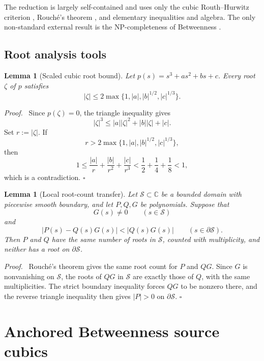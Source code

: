 \documentclass[final,5p,times,twocolumn]{elsarticle}
\newcommand{\C}{\mathbb C}
\newcommand{\abs}[1]{\left|#1\right|}
\newtheorem{lemma}[theorem]{Lemma}
\newenvironment{proof}[1][Proof]
  {\par\smallskip\noindent\textit{#1.}\ }
  {\hfill$\square$\par\smallskip}
\begin{document}
The reduction is largely self-contained and uses only the cubic Routh--Hurwitz criterion \cite{Gantmacher1959}, Rouch\'e's theorem \cite{Conway1978}, and elementary inequalities and algebra. The only non-standard external result is the NP-completeness of Betweenness \cite{Opatrny1979}.

\subsection{Root analysis tools}

\begin{lemma}[Scaled cubic root bound]\label{lem:scaled-cubic-bound}
Let $p(s)=s^3+as^2+bs+c$. Every root $\zeta$ of $p$ satisfies
\[
\abs\zeta\le2\max\{1,\abs a,\abs b^{1/2},\abs c^{1/3}\}.
\]
\end{lemma}

\begin{proof}
Since $p(\zeta)=0$, the triangle inequality gives
\[
\abs\zeta^3\le\abs a\abs\zeta^2+\abs b\abs\zeta+\abs c.
\]
Set $r:=\abs\zeta$. If
\[
r>2\max\{1,\abs a,\abs b^{1/2},\abs c^{1/3}\},
\]
then
\[
1\le\frac{\abs a}{r}+\frac{\abs b}{r^2}+\frac{\abs c}{r^3}
<\frac12+\frac14+\frac18<1,
\]
which is a contradiction.
\end{proof}

\begin{lemma}[Local root-count transfer]\label{lem:root-transfer}
Let $\mathcal{S}\subset\C$ be a bounded domain with piecewise smooth boundary, and let $P,Q,G$ be polynomials. Suppose that
\[
G(s)\ne0\qquad(s\in\mathcal{S})
\]
and
\[
\abs{P(s)-Q(s)G(s)}<\abs{Q(s)G(s)}
\qquad(s\in\partial\mathcal{S}).
\]
Then $P$ and $Q$ have the same number of roots in $\mathcal{S}$, counted with multiplicity, and neither has a root on $\partial\mathcal{S}$.
\end{lemma}

\begin{proof}
Rouch\'e's theorem gives the same root count for $P$ and $QG$. Since $G$ is nonvanishing on $\mathcal{S}$, the roots of $QG$ in $\mathcal{S}$ are exactly those of $Q$, with the same multiplicities. The strict boundary inequality forces $QG$ to be nonzero there, and the reverse triangle inequality then gives $\abs P>0$ on $\partial\mathcal{S}$.
\end{proof}

\section{Anchored Betweenness source cubics}\label{sec:source}
\end{document}
